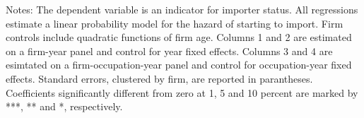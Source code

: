 \begin{tablenotes}
\item \footnotesize Notes: The dependent variable is an indicator for importer status. All regressions estimate a linear probability model for the hazard of starting to import. Firm controls include quadratic functions of firm age. Columns 1 and 2 are estimated on a firm-year panel and control for year fixed effects.  Columns 3 and 4 are esimtated on a firm-occupation-year panel and control for occupation-year fixed effects. Standard errors, clustered by firm, are reported in parantheses. Coefficients significantly different from zero at 1, 5 and 10 percent are marked by ***, ** and *, respectively.

\end{tablenotes} 